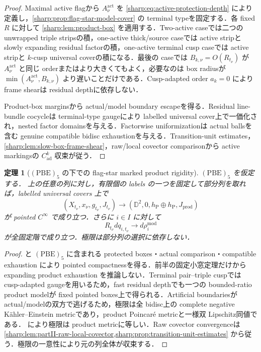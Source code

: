 \documentclass[a4paper,11pt]{ltjsarticle}
\numberwithin{equation}{section}
\theoremstyle{plain}
\newtheorem{theorem}{定理}[section]
\theoremstyle{definition}
\theoremstyle{remark}
\begin{document}
\begin{proof}
Maximal active flagから $A_\nu^{\mathrm{act}}$ を \eqref{sharp:eq:active-protection-depth} により定義し，\cref{sharp:prop:flag-star-model-cover} の terminal typeを固定する．各 fixed $R$ に対して \cref{sharp:lem:product-box} を適用する．Two-active caseでは二つの unwrapped triple stripsの積，one-active thick/source caseでは active stripと slowly expanding residual factorの積，one-active terminal cusp caseでは active stripと $k$-cusp universal coverの積になる．最後の caseでは $B_{k,\nu}=O(R_{t_\nu})$ が $A_\nu^{\mathrm{act}}$ と同じ orderまたはより大きくてもよく，必要なのは box radiusが $\min(A_\nu^{\mathrm{act}},B_{k,\nu})$ より遅いことだけである．Cusp-adapted order $a_k=0$ により frame shearは residual depthに依存しない．

Product-box marginsから actual/model boundary escapeを得る．Residual line-bundle cocycleは terminal-type gaugeにより labelled universal cover上で一価化され，nested factor domainsを与える．Factorwise uniformizationは actual ballsを含む genuine compatible bidisc exhaustionを与える．Transition-unit estimates，\cref{sharp:lem:slow-box-frame-shear}，raw/local covector comparisonから active markingsの $C^k_{\mathrm{ad}}$ 収束が従う．
\end{proof}

\begin{theorem}[$\mathrm{(PBE)}_5$ の下での flag-star marked product rigidity]\label{sharp:thm:partII-flag-star-product}
$\mathrm{(PBE)}_5$ を仮定する．
上の任意の列に対し，有限個の labels の一つを固定して部分列を取れば，labelled universal covers 上で
\[
 (X_{t_\nu},x_\nu,g_{t_\nu},J_{t_\nu})
 \longrightarrow
 (\mathbb D^2,0,h_{\mathrm P}\oplus h_{\mathrm P},J_{\mathrm{prod}})
\]
が pointed $C^\infty$ で成り立つ．さらに $i\in I$ に対して
\[
 R_{t_\nu}dq_{i,t_\nu}\longrightarrow d\rho_i^{\mathrm{mod}}
\]
が全固定階で成り立つ．極限は部分列の選択に依存しない．
\end{theorem}

\begin{proof}
 と $\mathrm{(PBE)}_5$ に含まれる protected boxes・actual comparison・compatible exhaustion により pointed compactnessを得る．前半の固定小窓定理だけから expanding product exhaustion を推論しない．Terminal pair--triple cuspでは cusp-adapted gaugeを用いるため，fast residual depthでも一つの bounded-ratio product modelが fixed pointed boxes上で得られる．Artificial boundariesが actual/modelの双方で逃げるため，極限は全 bidisc上の complete negative K\"ahler--Einstein metricであり，product Poincar\'e metricと一様双 Lipschitz同値である． により極限は product metricに等しい．Raw covector convergenceは \cref{sharp:lem:partII-raw-local-covector,sharp:prop:transition-unit-estimates} から従う．極限の一意性により元の列全体が収束する．
\end{proof}
\end{document}
